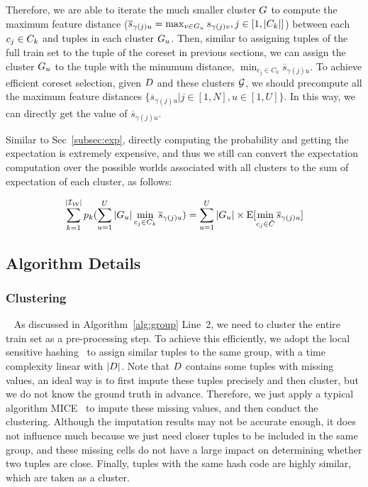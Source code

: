 Therefore,  we are able to iterate the much smaller cluster $G$ to compute  the maximum feature distance (\ie $\overline{s}_{\gamma(j)u} = \max_{v \in G_u}s_{\gamma(j)v}, j \in [1,|C_k|]$) between each $c_j \in C_k$ and tuples in each cluster $G_u$. Then, similar to assigning tuples of the full train set to the tuple of the coreset in previous sections, we can assign the cluster $G_u$ to the tuple  with the minumum distance, \ie $\min_{c_j\in C_k} \overline{s}_{\gamma(j)u}$. To achieve efficient coreset selection, given $D$ and these clusters $\mathcal{G}$, we should precompute all the maximum feature distances $\{\overline{s}_{\gamma(j)u}|j \in [1,N], u \in [1,U]\}$. In this way, we can directly get the value of $\overline{s}_{\gamma(j)u}$.

Similar to Sec~\ref{subsec:exp}, directly computing the probability and getting the expectation is extremely expensive, and thus we still can convert the expectation computation over the possible worlds associated with all clusters to the sum of expectation of each cluster, as follows:

\begin{equation}\label{eqa:cluster-4}
    \begin{aligned}
        \sum_{k= 1}^{|\mathcal{I_W}|} p_k (\sum_{u=1}^U |G_u| \min_{c_j\in C_k} \overline{s}_{\gamma(j)u}) = \sum_{u=1}^U  |G_u| \times\mathrm{E}[\min_{c_j\in \hat{C}}\overline{s}_{\gamma(j)u}]
    \end{aligned}
\end{equation}

\subsection{Algorithm Details}

\vspace{.5em}

\subsubsection{Clustering}~\label{subsec:clustering}
As discussed in Algorithm~\ref{alg:group} Line~2, we need to cluster the entire train set as a pre-processing step. To achieve this efficiently, we adopt the local sensitive hashing~\cite{DBLP:conf/focs/AndoniI06} to assign similar tuples to the same group, with a time complexity linear with $|D|$.
%
Note that $D$ contains some tuples with missing values, an ideal way is to first impute these tuples precisely and then cluster, but we do not know the ground truth in advance. Therefore, we just apply a typical algorithm \ie MICE~\cite{royston2011multiple} to impute these missing values, and then conduct the clustering. Although the imputation results may  not be accurate enough, it does not influence much because we just need closer tuples to be included in the same group, and these missing cells do not have a large impact on determining whether two tuples are close. 
%
Finally, tuples with the same hash code are highly similar, which are taken as a cluster.

